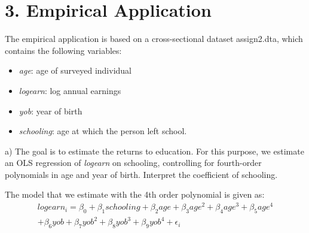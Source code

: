 \documentclass[a4paper,12pt,oneside,English]{article}
\begin{document}
\newpage
\section{3. Empirical Application}

The empirical application is based on a cross-sectional dataset assign2.dta, which contains the following variables:
\begin{itemize}
    \item \textit{age}: age of surveyed individual
    \item \textit{logearn}: log annual earnings
    \item \textit{yob}: year of birth
    \item \textit{schooling}: age at which the person left school.
\end{itemize}

a) The goal is to estimate the returns to education. For this purpose, we estimate an OLS regression of \textit{logearn} on schooling, controlling for fourth-order polynomials in age and year of birth. Interpret the coefficient of schooling.

The model that we estimate with the 4th order polynomial is given as:
\begin{multline}
    logearn_i = \beta_0 + \beta_1 {schooling} + \beta_2 {age} + \beta_3 {age^2} + \beta_4 {age^3} + \beta_5 {age^4} \\
    + \beta_6 {yob} + \beta_7 {yob^2} + \beta_8 {yob^3} + \beta_9 {yob^4} + \epsilon_i
\end{multline}
\end{document}
